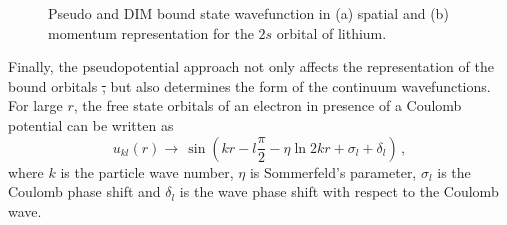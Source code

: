 \documentclass[10pt]{article}
\providecommand{\DIFaddtex}[1]{{\protect\color{blue}\uwave{#1}}} %
\providecommand{\DIFdeltex}[1]{{\protect\color{red}\sout{#1}}}                      %
\providecommand{\DIFaddbegin}{} %
\providecommand{\DIFaddend}{} %
\providecommand{\DIFdelbegin}{} %
\providecommand{\DIFdelend}{} %
\providecommand{\DIFadd}[1]{\texorpdfstring{\DIFaddtex{#1}}{#1}} %
\providecommand{\DIFdel}[1]{\texorpdfstring{\DIFdeltex{#1}}{}} %
\newcommand{\DIFscaledelfig}{0.5}
\newlength{\DIFdelgraphicswidth} %
\newlength{\DIFdelgraphicsheight} %
\newcommand{\DIFaddincludegraphics}[2][]{{\color{blue}\fbox{\DIFOincludegraphics[#1]{#2}}}} %
\newcommand{\DIFdelincludegraphics}[2][]{%
\sbox{\DIFdelgraphicsbox}{\DIFOincludegraphics[#1]{#2}}%
\settoboxwidth{\DIFdelgraphicswidth}{\DIFdelgraphicsbox} %
\settoboxtotalheight{\DIFdelgraphicsheight}{\DIFdelgraphicsbox} %
\scalebox{\DIFscaledelfig}{%
\parbox[b]{\DIFdelgraphicswidth}{\usebox{\DIFdelgraphicsbox}\\[-\baselineskip] \rule{\DIFdelgraphicswidth}{0em}}\llap{\resizebox{\DIFdelgraphicswidth}{\DIFdelgraphicsheight}{%
\setlength{\unitlength}{\DIFdelgraphicswidth}%
\begin{picture}(1,1)%
\thicklines\linethickness{2pt} %
{\color[rgb]{1,0,0}\put(0,0){\framebox(1,1){}}}%
{\color[rgb]{1,0,0}\put(0,0){\line( 1,1){1}}}%
{\color[rgb]{1,0,0}\put(0,1){\line(1,-1){1}}}%
\end{picture}%
}\hspace*{3pt}}} %
} %
\DeclareRobustCommand{\DIFaddbegin}{\DIFOaddbegin \let\includegraphics\DIFaddincludegraphics} %
\DeclareRobustCommand{\DIFaddend}{\DIFOaddend \let\includegraphics\DIFOincludegraphics} %
\DeclareRobustCommand{\DIFdelbegin}{\DIFOdelbegin \let\includegraphics\DIFdelincludegraphics} %
\DeclareRobustCommand{\DIFdelend}{\DIFOaddend \let\includegraphics\DIFOincludegraphics} %
\begin{document}
\begin{figure}[H]
 \caption{Pseudo and DIM bound state wavefunction in (a) spatial
 and (b) momentum representation for the
 $2s$ orbital of lithium.}
 \label{fig:wavesLi}
\end{figure}

Finally, the pseudopotential approach not only affects the 
representation of the bound orbitals \DIFdelbegin \DIFdel{, }\DIFdelend but also determines the form of 
the continuum wavefunctions. For large $r$, the free state orbitals of 
an electron in \DIFaddbegin \DIFadd{the }\DIFaddend presence of a Coulomb potential can be written as
\begin{equation}
 u_{kl}(r) \rightarrow \,\sin \left( kr - l\frac{\pi}{2} - \eta \ln 2kr +
 \sigma_l + \delta_l \right)\,,
\end{equation}
where $k$ is the particle wave number, $\eta$ is Sommerfeld's 
parameter, $\sigma_l$ is the Coulomb phase shift and $\delta_l$ is the 
wave phase shift with respect to the Coulomb wave.
\end{document}
